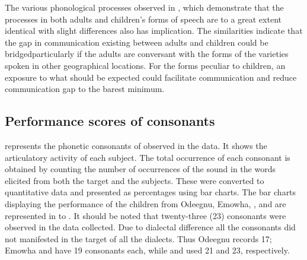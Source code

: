 \documentclass[output=paper,
modfonts
]{langscibook}
\begin{document}
The various phonological processes observed in , which demonstrate that the processes in both adults and children’s forms of speech are to a great extent identical with slight differences also has implication. The similarities indicate that the gap in communication existing between adults and children could be bridgedparticularly if the adults are conversant with the forms of the varieties spoken in other geographical locations. For the forms peculiar to children, an exposure to what should be expected could facilitate communication and reduce communication gap to the barest minimum.

\subsection{Performance scores of consonants}\label{sec:alerechi:2.1}

 represents the phonetic consonants of  observed in the data. It shows the articulatory activity of each subject. The total occurrence of each consonant is obtained by counting the number of occurrences of the sound in the words elicited from both the target and the subjects. These were converted to quantitative data and presented as percentages using bar charts. The bar charts displaying the performance of the children from Odeegnu, Emowha, ,  and  are represented in  to . It should be noted that twenty-three (23) consonants were observed in the data collected. Due to dialectal difference all the consonants did not manifested in the target of all the dialects. Thus Odeegnu records 17; Emowha and  have 19 consonants each, while  and  used 21 and 23, respectively.
\end{document}
